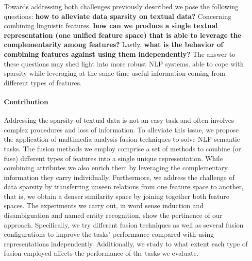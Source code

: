 Towards addressing both challenges previously described we pose the following questions: \textbf{how to alleviate data sparsity on textual data?}  Concerning combining linguistic features, \textbf{how can we produce a single textual representation (one unified feature space) that is able to leverage the complementarity among features?} Lastly, \textbf{what is the behavior of combining features against using them independently?} The answer to these questions may shed light into more robust NLP systems, able to cope with sparsity while leveraging at the same time useful information coming from different types of features.





\paragraph{Contribution}












Addressing the sparsity of textual data is not an easy task and often involves complex procedures and loss of information. To alleviate this issue, we propose the application of multimedia analysis fusion techniques to solve NLP semantic tasks. The fusion methods we employ comprise a set of methods to combine (or fuse) different types of features into a single unique representation. While combining attributes we also enrich them by leveraging the complementary information  they carry individually. Furthermore, we address the challenge of data sparsity by transferring unseen relations from one feature space to another, that is, we obtain a denser similarity space by joining together both feature spaces. The experiments we carry out, in word sense induction and disambiguation and named entity recognition, show the pertinence of our approach. Specifically, we try different fusion techniques as well as several fusion configurations to improve the tasks' performance compared with using representations independently. Additionally, we study to what extent each type of fusion employed affects the performance of the tasks we evaluate.



